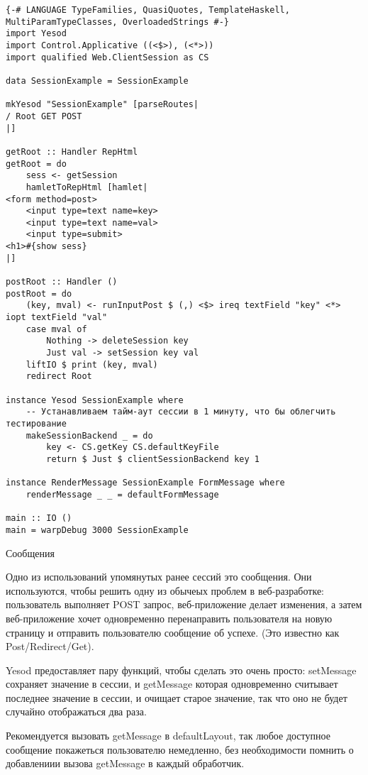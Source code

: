 \begin{lstlisting}
{-# LANGUAGE TypeFamilies, QuasiQuotes, TemplateHaskell, MultiParamTypeClasses, OverloadedStrings #-}
import Yesod
import Control.Applicative ((<$>), (<*>))
import qualified Web.ClientSession as CS

data SessionExample = SessionExample

mkYesod "SessionExample" [parseRoutes|
/ Root GET POST
|]

getRoot :: Handler RepHtml
getRoot = do
    sess <- getSession
    hamletToRepHtml [hamlet|
<form method=post>
    <input type=text name=key>
    <input type=text name=val>
    <input type=submit>
<h1>#{show sess}
|]

postRoot :: Handler ()
postRoot = do
    (key, mval) <- runInputPost $ (,) <$> ireq textField "key" <*> iopt textField "val"
    case mval of
        Nothing -> deleteSession key
        Just val -> setSession key val
    liftIO $ print (key, mval)
    redirect Root

instance Yesod SessionExample where
    -- Устанавливаем тайм-аут сессии в 1 минуту, что бы облегчить тестирование
    makeSessionBackend _ = do
        key <- CS.getKey CS.defaultKeyFile
        return $ Just $ clientSessionBackend key 1

instance RenderMessage SessionExample FormMessage where
    renderMessage _ _ = defaultFormMessage

main :: IO ()
main = warpDebug 3000 SessionExample
\end{lstlisting}

Сообщения

Одно из использований упомянутых ранее сессий это сообщения. Они используются, чтобы решить одну из обычеых проблем в веб-разработке: пользователь выполняет POST запрос, веб-приложение делает изменения, а затем веб-приложение хочет одновременно перенаправить пользователя на новую страницу и отправить пользователю сообщение об успехе. (Это известно как Post/Redirect/Get).

Yesod предоставляет пару функций, чтобы сделать это очень просто: setMessage сохраняет значение в сессии, и getMessage которая одновременно считывает последнее значение в сессии, и очищает старое значение, так что оно не будет случайно отображаться два раза. 

Рекомендуется вызовать getMessage в defaultLayout, так любое доступное сообщение покажеться пользователю немедленно, без необходимости помнить о добавлениии вызова getMessage в каждый обработчик. 

